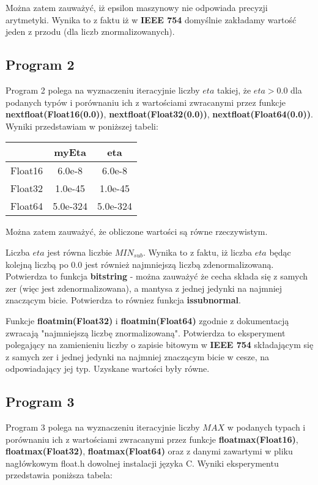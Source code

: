 \documentclass[12pt]{article}
\begin{document}
Można zatem zauważyć, iż epsilon maszynowy nie odpowiada precyzji arytmetyki. Wynika to z faktu iż w \textbf{IEEE 754} domyślnie zakładamy wartość jeden z przodu (dla liczb znormalizowanych). 

\subsection{Program 2}
Program 2 polega na wyznaczeniu iteracyjnie liczby $eta$ takiej, że $eta > 0.0$ dla podanych typów i porównaniu ich z wartościami zwracanymi przez funkcje \textbf{nextfloat(Float16(0.0))}, \textbf{nextfloat(Float32(0.0))}, \textbf{nextfloat(Float64(0.0))}. Wyniki przedstawiam w poniższej tabeli:
\begin{table}[h]
	\centering
    \label{tab:table1}
    \begin{tabular}{|c|c|c|}
    		\hline
      	& myEta & eta\\
		\hline
		Float16 & 6.0e-8 & 6.0e-8\\
		\hline
		Float32 & 1.0e-45 & 1.0e-45\\
		\hline
		Float64 & 5.0e-324 & 5.0e-324\\
		\hline
    \end{tabular}
\end{table}

Można zatem zauważyć, że obliczone wartości są równe rzeczywistym.

Liczba $eta$ jest równa liczbie $MIN_{sub}$. Wynika to z faktu, iż liczba $eta$ będąc kolejną liczbą po $0.0$ jest również najmniejszą liczbą zdenormalizowaną. Potwierdza to funkcja \textbf{bitstring} - można zauważyć że cecha składa się z samych zer (więc jest zdenormalizowana), a mantysa z jednej jedynki na najmniej znaczącym bicie. Potwierdza to równiez funkcja \textbf{issubnormal}.

Funkcje \textbf{floatmin(Float32)} i \textbf{floatmin(Float64)} zgodnie z dokumentacją  zwracają "najmniejszą liczbę znormalizowaną". Potwierdza to eksperyment polegający na zamienieniu liczby o zapisie bitowym w \textbf{IEEE 754} składającym się z samych zer i  jednej jedynki na najmniej znaczącym bicie w cesze, na odpowiadający jej typ. Uzyskane wartości były równe.

\subsection{Program 3}
Program 3 polega na wyznaczeniu iteracyjnie liczby $MAX$ w podanych typach i porównaniu ich z wartościami zwracanymi przez funkcje \textbf{floatmax(Float16)}, \textbf{floatmax(Float32)}, \textbf{floatmax(Float64)} oraz z danymi zawartymi w pliku nagłówkowym float.h dowolnej instalacji języka C. Wyniki eksperymentu przedstawia poniższa tabela:
\end{document}
